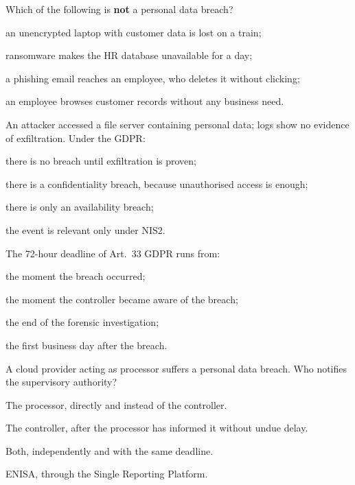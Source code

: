 \begin{domanda}\label{q:def-breach}
Which of the following is \textbf{not} a personal data breach?
\begin{opzioni}
  \item an unencrypted laptop with customer data is lost on a train;
  \item ransomware makes the HR database unavailable for a day;
  \item a phishing email reaches an employee, who deletes it without clicking;
  \item an employee browses customer records without any business need.
\end{opzioni}
\end{domanda}

\begin{domanda}\label{q:accesso}
An attacker accessed a file server containing personal data; logs show no evidence of exfiltration.
Under the GDPR:
\begin{opzioni}
  \item there is no breach until exfiltration is proven;
  \item there is a confidentiality breach, because unauthorised access is enough;
  \item there is only an availability breach;
  \item the event is relevant only under NIS2.
\end{opzioni}
\end{domanda}

\begin{domanda}\label{q:decorrenza}
The 72-hour deadline of Art.~33 GDPR runs from:
\begin{opzioni}
  \item the moment the breach occurred;
  \item the moment the controller became aware of the breach;
  \item the end of the forensic investigation;
  \item the first business day after the breach.
\end{opzioni}
\end{domanda}

\begin{domanda}\label{q:responsabile}
A cloud provider acting as processor suffers a personal data breach. Who notifies the supervisory
authority?
\begin{opzioni}
  \item The processor, directly and instead of the controller.
  \item The controller, after the processor has informed it without undue delay.
  \item Both, independently and with the same deadline.
  \item ENISA, through the Single Reporting Platform.
\end{opzioni}
\end{domanda}


